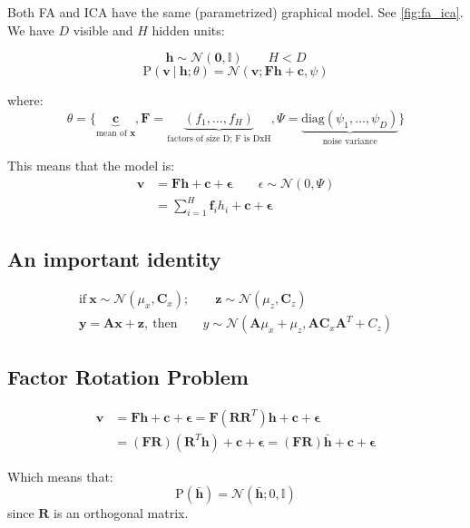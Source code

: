 \documentclass{article}
\newcommand{\prob}{\text{P}}
\renewcommand{\vec}[1]{\mathbf{#1}}
\newcommand{\bx}{\vec{x}}
\newcommand{\giv}{\ |\ }
\begin{document}
Both FA and ICA have the same (parametrized) graphical model. See \autoref{fig:fa_ica}. We have $D$ visible and $H$ hidden units:

$$
    \mathbf{h} \sim \mathcal{N}(\mathbf{0}, \mathbb{I}) \qquad H < D
$$
$$
    \prob(\mathbf{v} \giv \mathbf{\mathbf{h}}; \theta) = \mathcal{N}(\mathbf{v}; \mathbf{F} \mathbf{h} + \mathbf{c}, \psi)
$$

where:
$$
    \theta = \{ 
        \underbrace{\mathbf{c}}_{\text{mean of } \mathbf{x}},
        \mathbf{F} = 
            \underbrace{(f_1, \dots, f_H)}_{\text{factors of size D; F is DxH}},
        \Psi = 
            \underbrace{\text{diag}(\psi_1, \dots, \psi_D)}_{\text{noise variance}}
    \}
$$

This means that the model is:
\begin{align*}
    \mathbf{v} &= \mathbf{F} \mathbf{h} + \mathbf{c} + \mathbf{\epsilon} \qquad \epsilon \sim \mathcal{N}(0, \Psi)\\
    &= \sum_{i = 1}^H \mathbf{f}_i h_i + \mathbf{c} + \mathbf{\epsilon}
\end{align*}

\subsection{An important identity}
\begin{gather*}
    \text{if}\ \bx \sim \mathcal{N}(\mu_x, \mathbf{C}_x);
        \qquad \mathbf{z} \sim \mathcal{N} (\mu_z, \mathbf{C}_z) \\
    \mathbf{y} = \mathbf{A} \mathbf{x} + \mathbf{z},\
    \text{then} \qquad y \sim \mathcal{N}(
        \mathbf{A} \mu_x + \mu_z,
        \mathbf{A} \mathbf{C}_x \mathbf{A}^{T} + C_z
    )
\end{gather*}

\subsection{Factor Rotation Problem}
\begin{align*}
    \mathbf{v} &= \mathbf{F} \mathbf{h} + \mathbf{c} + \mathbf{\epsilon} = \mathbf{F} (\mathbf{R} \mathbf{R}^{T}) \mathbf{h} + \mathbf{c} + \mathbf{\epsilon} \\
    &= (\mathbf{F} \mathbf{R}) (\mathbf{R}^{T} \mathbf{h}) + \mathbf{c} + \mathbf{\epsilon} =
    (\mathbf{F} \mathbf{R}) \bar{\mathbf{h}} + \mathbf{c} + \mathbf{\epsilon}
\end{align*}

Which means that:
$$
    \prob(\bar{\mathbf{h}}) = \mathcal{N}(
        \bar{\mathbf{h}}; 0, \mathbb{I}
    )
$$
since $\mathbf{R}$ is an orthogonal matrix.
\end{document}
